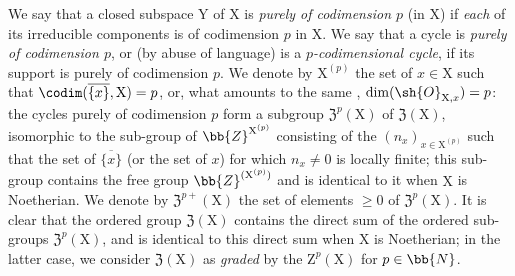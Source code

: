 \begin{env}[21.6.2]
\label{IV.21.6.2}
We say that a closed subspace $\mathrm{Y}$ of $\mathrm{X}$ is \emph{purely of codimension $p$} (in $\mathrm{X}$) if \emph{each} of its irreducible components is of codimension $p$ in $\mathrm{X}$.
We say that a cycle is \emph{purely of codimension $p$}, or (by abuse of language) is a \emph{$p$-codimensional cycle}, if its support is purely of codimension $p$.
We denote by $\mathrm{X}^{(p)}$ the set of $x\in\mathrm{X}$ such that $\codim(\overline{\{x\}},\mathrm{X})=p$, or, what amounts to the same ,{} $\dim(\sh{O}_{\mathrm{X},x})=p$:
the cycles purely of codimension $p$ form a subgroup $\mathfrak{Z}^p(\mathrm{X})$ of $\mathfrak{Z}(\mathrm{X})$, isomorphic to the sub-group of $\bb{Z}^{\mathrm{X}^{(p)}}$ consisting of the $(n_x)_{x\in\mathrm{X}^{(p)}}$ such that the set of $\overline{\{x\}}$ (or the set of $x$) for which $n_x\neq 0$ is locally finite;
this sub-group contains the free group $\bb{Z}^{(\mathrm{X}^{(p)})}$ and is identical to it when $\mathrm{X}$ is Noetherian.
We denote by $\mathfrak{Z}^{p+}(\mathrm{X})$ the set of elements $\geq 0$ of $\mathfrak{Z}^p(\mathrm{X})$.
It is clear that the ordered group $\mathfrak{Z}(\mathrm{X})$ contains the direct sum of the ordered sub-groups $\mathfrak{Z}^p(\mathrm{X})$, and is identical to this direct sum when $\mathrm{X}$ is Noetherian;
in the latter case, we consider $\mathfrak{Z}(\mathrm{X})$ as \emph{graded} by the $\mathrm{Z}^p(\mathrm{X})$ for $p\in\bb{N}$.
\end{env}

